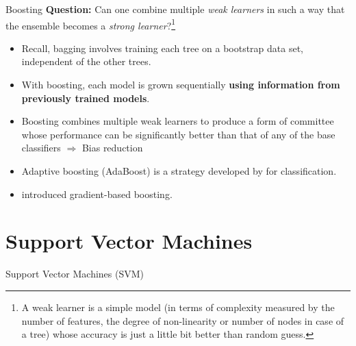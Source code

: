 \documentclass[11pt]{beamer}
\begin{document}
\begin{frame}{Boosting}
	\textbf{Question:} Can one combine multiple \textit{weak learners} in such a way that the ensemble becomes a \textit{strong learner}?\footnote{A weak learner is a simple model (in terms of complexity measured by the number of features, the degree of non-linearity or number of nodes in case of a tree) whose accuracy is just a little bit better than random guess.}
	\vfill

	\begin{itemize}
		\item Recall, bagging involves training each tree on a bootstrap data set, independent of the other trees.
		\item With boosting, each model is grown sequentially \textbf{using information from previously trained models}.
		\item Boosting combines multiple weak learners to produce a form of committee whose performance can be significantly better than that of any of the base classifiers $\Rightarrow$ Bias reduction
		\item Adaptive boosting (AdaBoost) is a strategy developed by \citet{Freund.Schapire1996} for classification.
		\item \citet{Friedman2001} introduced gradient-based boosting.
	\end{itemize}
\end{frame}


\section{Support Vector Machines}

\begin{frame}
	\begin{center}
		\Large
		Support Vector Machines (SVM)
	\end{center}
\end{frame}
\end{document}
